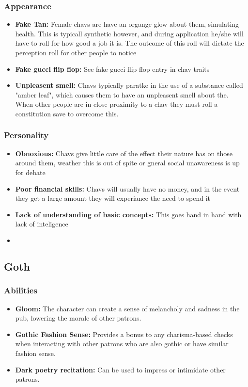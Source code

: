 \documentclass{book}
\begin{document}
\subsubsection{Appearance}
\begin{itemize}
    \item \textbf{Fake Tan:} Female chavs are have an organge glow about them, simulating health. This is typicall synthetic however, and during application he/she will have to roll for how good a job it is. The outcome of this roll will dictate the perception roll for other people to notice
    \item \textbf{Fake gucci flip flop:} See fake gucci flip flop entry in chav traits
    \item \textbf{Unpleasent smell:} Chavs typically paratke in the use of a substance called "amber leaf", which causes them to have an unpleasent smell about the. When other people are in close proximity to a chav they must roll a constitution save to overcome this.
\end{itemize}
\subsubsection{Personality}
\begin{itemize}
    \item \textbf{Obnoxious:} Chavs give little care of the effect their nature has on those around them, weather this is out of spite or gneral social unawareness is up for debate
    \item \textbf{Poor financial skills:}  Chavs will usually have no money, and in the event they get a large amount they will experiance the need to spend it
    \item \textbf{Lack of understanding of basic concepts:} This goes hand in hand with lack of inteligence
    \item 
\end{itemize}

\subsection{Goth}
\subsubsection{Abilities}
\begin{itemize}
    \item \textbf{Gloom:} The character can create a sense of melancholy and sadness in the pub, lowering the morale of other patrons.
    \item \textbf{Gothic Fashion Sense:} Provides a bonus to any charisma-based checks when interacting with other patrons who are also gothic or have similar fashion sense. 
    \item \textbf{Dark poetry recitation:} Can be used to impress or intimidate other patrons.
\end{itemize}
\end{document}
